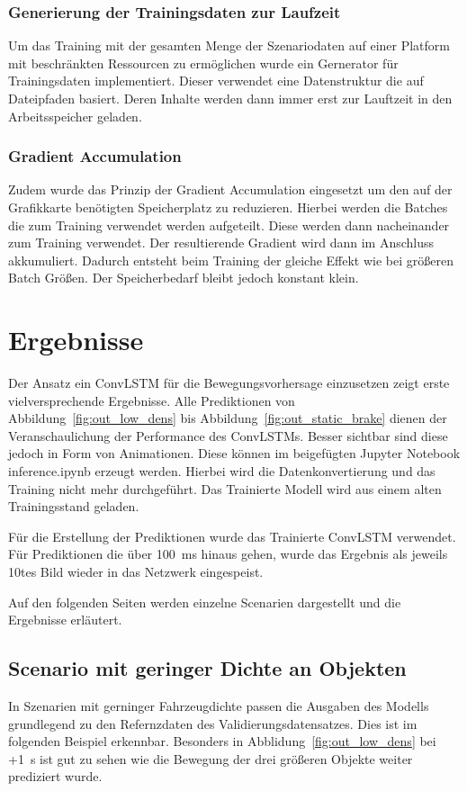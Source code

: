 \documentclass[12pt]{article}
\begin{document}
        \subsubsection{Generierung der Trainingsdaten zur Laufzeit}
            Um das Training mit der gesamten Menge der Szenariodaten auf einer Platform mit beschränkten Ressourcen zu ermöglichen wurde ein Gernerator für Trainingsdaten implementiert.
            Dieser verwendet eine Datenstruktur die auf Dateipfaden basiert. Deren Inhalte werden dann immer erst zur Lauftzeit in den Arbeitsspeicher geladen.
        \subsubsection{Gradient Accumulation}
            Zudem wurde das Prinzip der Gradient Accumulation eingesetzt um den auf der Grafikkarte benötigten Speicherplatz zu reduzieren. 
            Hierbei werden die Batches die zum Training verwendet werden aufgeteilt. Diese werden dann nacheinander zum Training verwendet. Der resultierende Gradient wird dann im Anschluss akkumuliert.
            Dadurch entsteht beim Training der gleiche Effekt wie bei größeren Batch Größen. Der Speicherbedarf bleibt jedoch konstant klein.~\cite{Ttowardsdatascience2021}
\pagebreak
\section{Ergebnisse}
\label{sec:results}
    Der Ansatz ein ConvLSTM für die Bewegungsvorhersage einzusetzen zeigt erste vielversprechende Ergebnisse.
    Alle Prediktionen von Abbildung~\ref{fig:out_low_dens} bis Abbildung~\ref{fig:out_static_brake} dienen der Veranschaulichung der Performance des ConvLSTMs. 
    Besser sichtbar sind diese jedoch in Form von Animationen. Diese können im beigefügten Jupyter Notebook inference.ipynb erzeugt werden. 
    Hierbei wird die Datenkonvertierung und das Training nicht mehr durchgeführt. Das Trainierte Modell wird aus einem alten Trainingsstand geladen.

    Für die Erstellung der Prediktionen wurde das Trainierte ConvLSTM verwendet. Für Prediktionen die über 100~ms hinaus gehen, wurde das Ergebnis als jeweils 10tes Bild wieder in das Netzwerk eingespeist.
    
    Auf den folgenden Seiten werden einzelne Scenarien dargestellt und die Ergebnisse erläutert.
    
    \pagebreak
    \subsection{Scenario mit geringer Dichte an Objekten}
        In Szenarien mit gerninger Fahrzeugdichte passen die Ausgaben des Modells grundlegend zu den Refernzdaten des Validierungsdatensatzes.
        Dies ist im folgenden Beispiel erkennbar. Besonders in Abblidung~\ref{fig:out_low_dens} bei +1~s ist gut zu sehen wie die Bewegung der drei größeren Objekte weiter prediziert wurde. 
\end{document}
